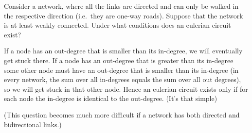 

Consider a network, where all the links are directed and can only be walked in the respective direction (i.e.~they are one-way roads). Suppose that the network is at least weakly connected. Under what conditions does an eulerian circuit exist?

\solution
If a node has an out-degree that is smaller than its in-degree, we will eventually get stuck there. If a node has an out-degree that is greater than its in-degree some other node must have an out-degree that is smaller than its in-degree (in every network, the sum over all in-degrees equals the sum over all out degrees), so we will get stuck in that other node. Hence an eulerian circuit exists only if for each node the in-degree is identical to the out-degree. (It's that simple)

(This question becomes much more difficult if a network has both directed and bidirectional links.) 

